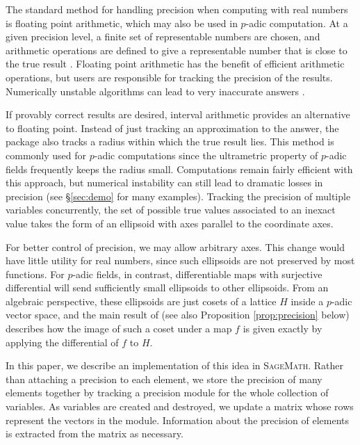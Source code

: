\documentclass[sigconf]{acmart}
\newcommand{\sage}{\textsc{SageMath}\xspace}
\theoremstyle{definition}
\begin{document}
The standard method for handling precision when computing with real numbers
is floating point arithmetic, which may also be used in $p$-adic computation.
At a given precision level, a finite set of representable numbers are chosen,
and arithmetic operations are defined to give a representable number
that is close to the true result \cite{ieee754:2008}.  Floating point arithmetic
has the benefit of efficient arithmetic operations, but users are responsible
for tracking the precision of the results.  Numerically unstable algorithms can
lead to very inaccurate answers \cite{higham:2002}.

If provably correct results are desired, interval arithmetic provides
an alternative to floating point.  Instead of just tracking an approximation to the answer,
the package also tracks a radius within which the true result lies.
This method is commonly used for $p$-adic computations since
the ultrametric property of $p$-adic fields frequently keeps the radius small.
Computations remain fairly efficient with this approach, but numerical instability
can still lead to dramatic losses in precision (see \S \ref{sec:demo} for many examples).
Tracking the precision of multiple variables concurrently, the set of possible
true values associated to an inexact value takes the form of an ellipsoid
with axes parallel to the coordinate axes.

For better control of precision, we may allow arbitrary axes.  This 
change would have little utility for real numbers, since such ellipsoids 
are not preserved by most functions. For $p$-adic fields, in contrast, 
differentiable maps with surjective differential will send sufficiently 
small ellipsoids to other ellipsoids.  From an algebraic perspective, 
these ellipsoids are just cosets of a lattice $H$ inside a $p$-adic 
vector space, and the main result of \cite{caruso-roe-vaccon:14a} (see 
also Proposition \ref{prop:precision} below) describes how the image of 
such a coset under a map $f$ is given exactly by applying the 
differential of $f$ to $H$.

In this paper, we describe an implementation of this idea in \sage \cite{sage}.
Rather than attaching a precision to each element, we store the precision of
many elements together by tracking a precision module for the whole collection
of variables.  As variables are created and destroyed, we update a matrix whose
rows represent the vectors in the module.  Information about the precision
of elements is extracted from the matrix as necessary.
\end{document}
